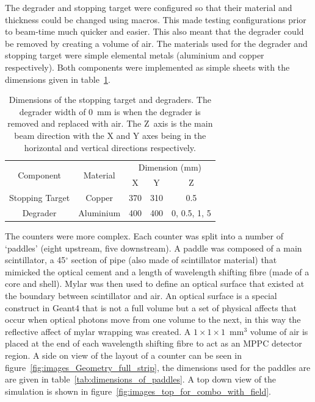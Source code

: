 The degrader and stopping target were configured so that their material and thickness could be changed using macros. This made testing configurations prior to beam-time much quicker and easier. This also meant that the degrader could be removed by creating a volume of air. The materials used for the degrader and stopping target were simple elemental metals (aluminium and copper respectively). Both components were implemented as simple sheets with the dimensions given in table~\ref{tab:st_and_deg_dimensions}.

\begin{table}
  \begin{center}
  \begin{tabular}{c | c | c | c | c}
    \multirow{2}{*}{Component}
                     &  \multirow{2}{*}{Material} 
                                   &  \multicolumn{3}{c}{Dimension (mm)}  \\
                     &             &   X   &   Y   &       Z       \\
    \hline
    Stopping Target  &  Copper     &  370  &  310  &      0.5      \\
    Degrader         &  Aluminium  &  400  &  400  & 0, 0.5, 1, 5  \\
    
  \end{tabular}
  \end{center}
  \caption{Dimensions of the stopping target and degraders. The degrader width of 0~mm is when the degrader is removed and replaced with air. The Z~axis is the main beam direction with the X and Y axes being in the horizontal and vertical directions respectively.}
  \label{tab:st_and_deg_dimensions}
\end{table}

The counters were more complex. Each counter was split into a number of `paddles' (eight upstream, five downstream). A paddle was composed of a main scintillator, a 45\(^{\circ}\) section of pipe (also made of scintillator material) that mimicked the optical cement and a length of wavelength shifting fibre (made of a core and shell). Mylar was then used to define an optical surface that existed at the boundary between scintillator and air. An optical surface is a special construct in Geant4 that is not a full volume but a set of physical affects that occur when optical photons move from one volume to the next, in this way the reflective affect of mylar wrapping was created. A \(1\times1\times1\)~mm\(^3\) volume of air is placed at the end of each wavelength shifting fibre to act as an MPPC detector region. A side on view of the layout of a counter can be seen in figure~\ref{fig:images_Geometry_full_strip}, the dimensions used for the paddles are are given in table~\ref{tab:dimensions_of_paddles}. A top down view of the simulation is shown in figure~\ref{fig:images_top_for_combo_with_field}.

